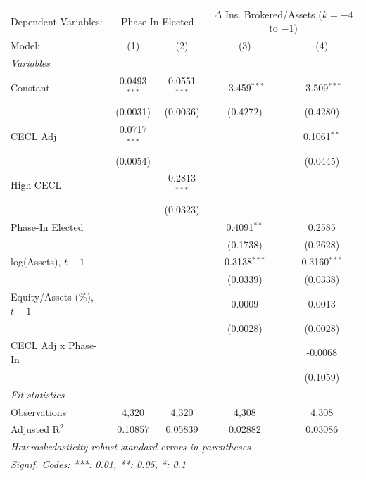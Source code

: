 
\begingroup
\centering
\begin{tabular}{lcccc}
   \tabularnewline \midrule \midrule
   Dependent Variables: & \multicolumn{2}{c}{Phase-In Elected} & \multicolumn{2}{c}{$\Delta$ Ins. Brokered/Assets ($k{=}{-}4$ to $-1$)}\\
   Model:                       & (1)            & (2)            & (3)            & (4)\\  
   \midrule
   \emph{Variables}\\
   Constant                     & 0.0493$^{***}$ & 0.0551$^{***}$ & -3.459$^{***}$ & -3.509$^{***}$\\   
                                & (0.0031)       & (0.0036)       & (0.4272)       & (0.4280)\\   
   CECL Adj                     & 0.0717$^{***}$ &                &                & 0.1061$^{**}$\\   
                                & (0.0054)       &                &                & (0.0445)\\   
   High CECL                    &                & 0.2813$^{***}$ &                &   \\   
                                &                & (0.0323)       &                &   \\   
   Phase-In Elected             &                &                & 0.4091$^{**}$  & 0.2585\\   
                                &                &                & (0.1738)       & (0.2628)\\   
   log(Assets), $t{-}1$         &                &                & 0.3138$^{***}$ & 0.3160$^{***}$\\   
                                &                &                & (0.0339)       & (0.0338)\\   
   Equity/Assets (\%), $t{-}1$  &                &                & 0.0009         & 0.0013\\   
                                &                &                & (0.0028)       & (0.0028)\\   
   CECL Adj x Phase-In          &                &                &                & -0.0068\\   
                                &                &                &                & (0.1059)\\   
   \midrule
   \emph{Fit statistics}\\
   Observations                 & 4,320          & 4,320          & 4,308          & 4,308\\  
   Adjusted R$^2$               & 0.10857        & 0.05839        & 0.02882        & 0.03086\\  
   \midrule \midrule
   \multicolumn{5}{l}{\emph{Heteroskedasticity-robust standard-errors in parentheses}}\\
   \multicolumn{5}{l}{\emph{Signif. Codes: ***: 0.01, **: 0.05, *: 0.1}}\\
\end{tabular}
\par\endgroup


